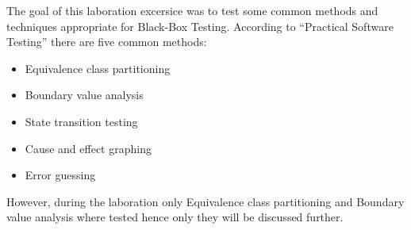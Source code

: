 The goal of this laboration excersice was to test some common methods and techniques appropriate for Black-Box Testing.
According to "`Practical Software Testing"' there are five common methods:
\begin{itemize}
	\item Equivalence class partitioning
	\item Boundary value analysis
	\item State transition testing
	\item Cause and effect graphing
	\item Error guessing
\end{itemize}

However, during the laboration only Equivalence class partitioning and Boundary value analysis where tested hence only they will be discussed further.

